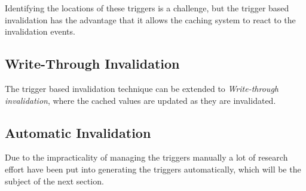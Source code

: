

Identifying the locations of these triggers is a challenge, but the trigger based invalidation has the advantage that it allows the caching system to react to the invalidation events.

\subsection{Write-Through Invalidation}
\label{subsec:write_through_invalidation}

The trigger based invalidation technique can be extended to \emph{Write-through invalidation}, where the cached values are updated as they are invalidated.











\subsection{Automatic Invalidation}
\label{subsec:automatic_invalidation}





Due to the impracticality of managing the triggers manually a lot of research effort have been put into generating the triggers automatically, which will be the subject of the next section.




